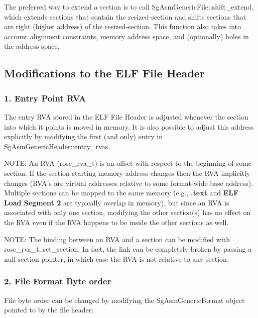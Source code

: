    The preferred way to extend a section is to call SgAsmGenericFile::shift\_extend, which extends sections that contain the
   resized-section and shifts sections that are right (higher address) of the resized-section.  This function also takes into
   account alignment constraints, memory address space, and (optionally) holes in the address space.

\subsection{Modifications to the ELF File Header}

\subsubsection{1. Entry Point RVA}

   The entry RVA stored in the ELF File Header is adjusted whenever the section into which it points is moved in memory. It is
   also possible to adjust this address explicitly by modifying the first (and only) entry in SgAsmGenericHeader::entry\_rvas.

   NOTE: An RVA (rose\_rva\_t) is an offset with respect to the beginning of some section. If the section starting memory address
   changes then the RVA implicitly changes (RVA's are virtual addresses relative to some format-wide base address). Multiple
   sections can be mapped to the same memory (e.g., {\bf.text} and {\bf ELF Load Segment 2} are typically overlap in memory), but
   since an RVA is associated with only one section, modifying the other section(s) has no effect on the RVA even if the RVA
   happens to be inside the other sections as well.

   NOTE: The binding between an RVA and a section can be modified with rose\_rva\_t::set\_section. In fact, the link can be
   completely broken by passing a null section pointer, in which case the RVA is not relative to any section.

\subsubsection{2. File Format Byte order}

   File byte order can be changed by modifying the SgAsmGenericFormat object pointed to by the file header:

